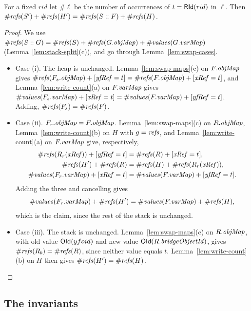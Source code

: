 \begin{lemma}
\label{lem:swap-count}
For a fixed $rid$ let $\#\ell$ be the number of
occurrences of $t = \mathsf{RId}(rid)$ in $\ell$. Then
$\#\mathit{refs}(S') + \#\mathit{refs}(H') = \#\mathit{refs}(S :: F) + \#\mathit{refs}(H)$.
\end{lemma}
\begin{proof}
We use $\#\mathit{refs}(S :: G) = \#\mathit{refs}(S) + \#\mathit{refs}(G.\mathit{objMap}) + \#\mathit{values}(G.\mathit{varMap})$
(Lemma~\ref{lem:stack-split}(c)), and go through Lemma~\ref{lem:swap-cases}.
\begin{itemize}[nosep]
  \item Case (i). The heap is unchanged. Lemma~\ref{lem:swap-maps}(c) on $F.\mathit{objMap}$ gives
    $\#\mathit{refs}(F_s.\mathit{objMap}) + [\mathit{yfRef} = t] = \#\mathit{refs}(F.\mathit{objMap}) + [\mathit{xRef} = t]$, and
    Lemma~\ref{lem:write-count}(a) on $F.\mathit{varMap}$ gives
    $\#\mathit{values}(F_s.\mathit{varMap}) + [\mathit{xRef} = t] = \#\mathit{values}(F.\mathit{varMap}) +
    [\mathit{yfRef} = t]$. Adding, $\#\mathit{refs}(F_s) = \#\mathit{refs}(F)$.
  \item Case (ii). $F_r.\mathit{objMap} = F.\mathit{objMap}$. Lemma~\ref{lem:swap-maps}(c) on $R.\mathit{objMap}$,
    Lemma~\ref{lem:write-count}(b) on $H$ with $g = \mathit{refs}$, and Lemma~\ref{lem:write-count}(a) on
    $F.\mathit{varMap}$ give, respectively,
    \[ \begin{aligned}
      \#\mathit{refs}(R_r(\mathit{xRef})) + [\mathit{yfRef} = t] &= \#\mathit{refs}(R) + [\mathit{xRef} = t],\\
      \#\mathit{refs}(H') + \#\mathit{refs}(R) &= \#\mathit{refs}(H) + \#\mathit{refs}(R_r(\mathit{xRef})),\\
      \#\mathit{values}(F_r.\mathit{varMap}) + [\mathit{xRef} = t]
        &= \#\mathit{values}(F.\mathit{varMap}) + [\mathit{yfRef} = t].
    \end{aligned} \]
    Adding the three and cancelling gives
    \[ \#\mathit{values}(F_r.\mathit{varMap}) + \#\mathit{refs}(H') = \#\mathit{values}(F.\mathit{varMap}) + \#\mathit{refs}(H), \]
    which is the claim, since the rest of the stack is unchanged.
  \item Case (iii). The stack is unchanged. Lemma~\ref{lem:swap-maps}(c) on $R.\mathit{objMap}$, with old value
    $\mathsf{OId}(yfoid)$ and new value $\mathsf{OId}(R.\mathit{bridgeObjectId})$, gives $\#\mathit{refs}(R_b) = \#\mathit{refs}(R)$, since neither
    value equals $t$. Lemma~\ref{lem:write-count}(b) on $H$ then gives $\#\mathit{refs}(H') = \#\mathit{refs}(H)$.
    \qedhere
\end{itemize}
\end{proof}

\subsection{The invariants}

